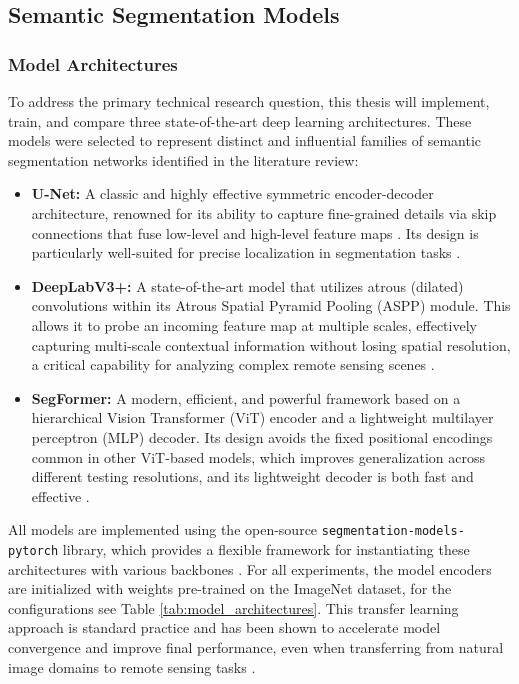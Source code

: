 \documentclass{report}
\begin{document}
\subsection{Semantic Segmentation Models}
\subsubsection{Model Architectures}
To address the primary technical research question, this thesis will implement, train, and compare three state-of-the-art deep learning architectures. These models were selected to represent distinct and influential families of semantic segmentation networks identified in the literature review:
\begin{itemize}
    \item \textbf{U-Net:} A classic and highly effective symmetric encoder-decoder architecture, renowned for its ability to capture fine-grained details via skip connections that fuse low-level and high-level feature maps \parencite[p.~4]{YuanEtAlreviewdeeplearningmethodssemanticsegmentationremotesensingimagery2021}. Its design is particularly well-suited for precise localization in segmentation tasks \parencite[p.~2]{RonnebergerEtAlUNetConvolutionalNetworksBiomedicalImageSegmentation2015}.
    \item \textbf{DeepLabV3+:} A state-of-the-art model that utilizes atrous (dilated) convolutions within its Atrous Spatial Pyramid Pooling (ASPP) module. This allows it to probe an incoming feature map at multiple scales, effectively capturing multi-scale contextual information without losing spatial resolution, a critical capability for analyzing complex remote sensing scenes \parencites[p.~179]{LuoEtAlSemanticsegmentationagriculturalimagessurvey2024} [p.~8f.]{SertelEtAlLandUseLandCoverMappingUsingDeepLearningBasedSegmentationApproachesVHRWorldview3Images2022}.
    \item \textbf{SegFormer:} A modern, efficient, and powerful framework based on a hierarchical Vision Transformer (ViT) encoder and a lightweight multilayer perceptron (MLP) decoder. Its design avoids the fixed positional encodings common in other ViT-based models, which improves generalization across different testing resolutions, and its lightweight decoder is both fast and effective \parencite[p.~1]{XieEtAlSegFormerSimpleEfficientDesignSemanticSegmentationTransformers2021}.
\end{itemize}
All models are implemented using the open-source \texttt{segmentation-models-pytorch} library, which provides a flexible framework for instantiating these architectures with various backbones \parencite{IakubovskiiSegmentationModelsPytorch2019}. For all experiments, the model encoders are initialized with weights pre-trained on the ImageNet dataset, for the configurations see Table \ref{tab:model_architectures}. This transfer learning approach is standard practice and has been shown to accelerate model convergence and improve final performance, even when transferring from natural image domains to remote sensing tasks \parencite[p.~2f.]{PiresDeLimaMarfurtConvolutionalNeuralNetworkRemoteSensingSceneClassificationTransferLearningAnalysis2019}.
\end{document}

